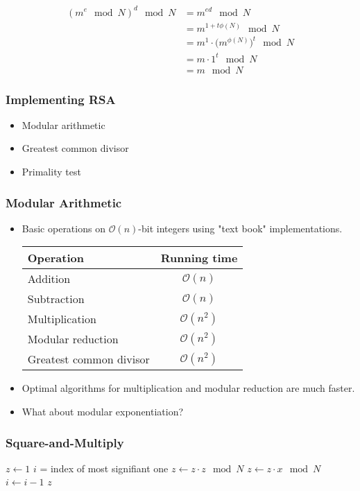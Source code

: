 \documentclass[a4paper]{scrartcl}
\begin{document}
\begin{align*}
(m^e \mod N)^d \mod N &= m^{ed} \mod N \\
&= m^{1+t \phi(N)} \mod N \\
&= m^1 \cdot \Big(m^{\phi(N)}\Big)^t \mod N \\
&= m \cdot 1^t \mod N \\
&= m \mod N
\end{align*}

\subsubsection*{Implementing RSA}

\begin{itemize}
\item Modular arithmetic
\item Greatest common divisor
\item Primality test
\end{itemize}

\subsubsection*{Modular Arithmetic}

\begin{itemize}
\item Basic operations on $\mathcal{O}(n)$-bit integers using "text book" implementations.
\begin{tabular}{l c}
Operation & Running time \\\hline
Addition & $\mathcal{O}(n)$ \\
Subtraction & $\mathcal{O}(n)$ \\
Multiplication & $\mathcal{O}(n^2)$ \\
Modular reduction & $\mathcal{O}(n^2)$ \\
Greatest common divisor & $\mathcal{O}(n^2)$
\end{tabular}
\item Optimal algorithms for multiplication and modular reduction are much faster.
\item What about modular exponentiation?
\end{itemize}

\subsubsection*{Square-and-Multiply}

\begin{algorithmic}[1]
\State $z \gets 1$
\State $i$ = index of most signifiant one
\State $z \gets z \cdot z \mod N$
\State $z \gets z \cdot x \mod N$
\EndIf
\State $i \gets i - 1$
\EndWhile
\State \Return $z$
\EndProcedure
\end{algorithmic}
\end{document}
